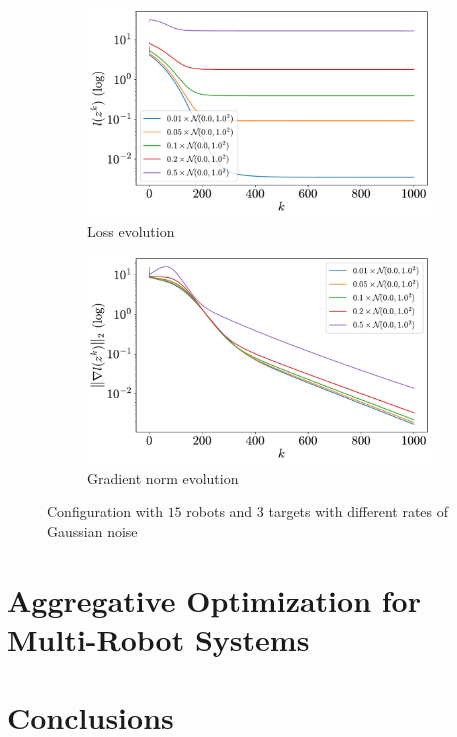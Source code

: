 \documentclass[a4paper,11pt,oneside]{book}
\begin{document}
\begin{figure}[ht]
      \centering
      \begin{subfigure}[t]{0.49\textwidth}
            \centering
            \includegraphics[width=\linewidth]{./figs/tracking/loss_rates_15_3_2_1000.pdf} 
            \caption{Loss evolution}
      \end{subfigure}
      \hfill
      \begin{subfigure}[t]{0.49\textwidth}
            \centering
            \includegraphics[width=\linewidth]{./figs/tracking/gradient_rates_15_3_2_1000.pdf} 
            \caption{Gradient norm evolution}
      \end{subfigure}
      \caption{Configuration with $15$ robots and $3$ targets with different rates of Gaussian noise}
      \label{fig:tracking_rates_15_3}
\end{figure}


\chapter{Aggregative Optimization for Multi-Robot Systems}





\chapter*{Conclusions}



{}

\end{document}
